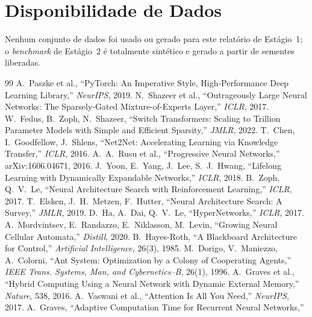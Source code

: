 \documentclass[11pt]{article}
\begin{document}
\section*{Disponibilidade de Dados}
Nenhum conjunto de dados foi usado ou gerado para este relatório de Estágio~1; o
\emph{benchmark} de Estágio~2 é totalmente sintético e gerado a partir de sementes
liberadas.

\begin{thebibliography}{99}
\small
{} A.~Paszke et al.,
``PyTorch: An Imperative Style, High-Performance Deep Learning Library,''
\emph{NeurIPS}, 2019.
 N.~Shazeer et al.,
``Outrageously Large Neural Networks: The Sparsely-Gated Mixture-of-Experts
Layer,'' \emph{ICLR}, 2017.
 W.~Fedus, B.~Zoph, N.~Shazeer,
``Switch Transformers: Scaling to Trillion Parameter Models with Simple and
Efficient Sparsity,'' \emph{JMLR}, 2022.
 T.~Chen, I.~Goodfellow, J.~Shlens,
``Net2Net: Accelerating Learning via Knowledge Transfer,'' \emph{ICLR}, 2016.
 A.~A.~Rusu et al.,
``Progressive Neural Networks,'' arXiv:1606.04671, 2016.
 J.~Yoon, E.~Yang, J.~Lee, S.~J.~Hwang,
``Lifelong Learning with Dynamically Expandable Networks,'' \emph{ICLR}, 2018.
 B.~Zoph, Q.~V.~Le,
``Neural Architecture Search with Reinforcement Learning,'' \emph{ICLR}, 2017.
 T.~Elsken, J.~H.~Metzen, F.~Hutter,
``Neural Architecture Search: A Survey,'' \emph{JMLR}, 2019.
 D.~Ha, A.~Dai, Q.~V.~Le,
``HyperNetworks,'' \emph{ICLR}, 2017.
 A.~Mordvintsev, E.~Randazzo, E.~Niklasson,
M.~Levin, ``Growing Neural Cellular Automata,'' \emph{Distill}, 2020.
 B.~Hayes-Roth,
``A Blackboard Architecture for Control,'' \emph{Artificial Intelligence},
26(3), 1985.
 M.~Dorigo, V.~Maniezzo, A.~Colorni,
``Ant System: Optimization by a Colony of Cooperating Agents,''
\emph{IEEE Trans. Systems, Man, and Cybernetics--B}, 26(1), 1996.
 A.~Graves et al.,
``Hybrid Computing Using a Neural Network with Dynamic External Memory,''
\emph{Nature}, 538, 2016.
 A.~Vaswani et al.,
``Attention Is All You Need,'' \emph{NeurIPS}, 2017.
 A.~Graves,
``Adaptive Computation Time for Recurrent Neural Networks,''

\end{thebibliography}
\end{document}
